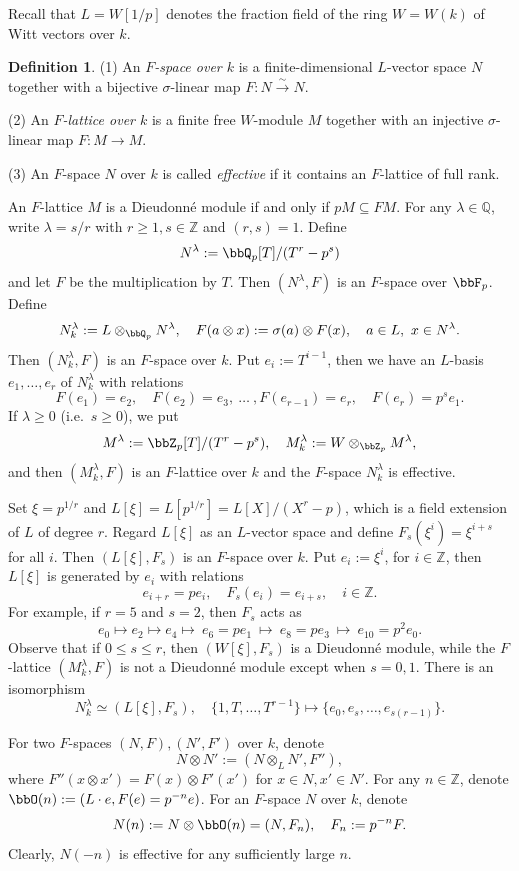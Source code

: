\documentclass[]{amsart}
\theoremstyle{plain}
\theoremstyle{definition}
\newtheorem{defn}[thm]{Definition}
\theoremstyle{remark}
\def\Fp{{\bbF}_p}
\def\Qp{{\bbQ}_p}
\def\Zp{{\bbZ}_p}
\newcommand{\Z}{\mathbb Z}
\newcommand{\Q}{\mathbb Q}
\newcommand{\npr}{\noindent }
\newcommand{\<}{\langle}   %
\renewcommand{\>}{\rangle} %
\newcommand{\isoto}{\stackrel{\sim}{\longrightarrow}}
\newcommand{\dieu}{Dieudonn\'{e} }
\begin{document}
Recall that $L=W[1/p]$ denotes the fraction field of the ring $W=W(k)$ of Witt vectors over $k$. 
\begin{defn}

    (1) An \emph{$F$-space over $k$} is a finite-dimensional $L$-vector space $N$ together with a bijective $\sigma$-linear map $F:N\isoto N$. 

    (2) An \emph{$F$-lattice over $k$} is a finite free $W$-module $M$ together with an injective $\sigma$-linear map $F:M\to M$. 

    (3) An $F$-space $N$ over $k$ is called \emph{effective} if it contains an $F$-lattice of full rank. 
\end{defn}
An $F$-lattice $M$ is a \dieu module if and only if $pM \subseteq FM$. 
For any $\lambda\in \Q$, write $\lambda=s/r$ with $r\ge 1,s\in \Z$ and $(r,s)=1$. Define
\[ N^\lambda:=\Qp[T]/(T^r-p^s)\]
and let $F$ be the multiplication by $T$. Then $(N^\lambda, F)$ is an $F$-space over $\Fp$. Define
\[ N^\lambda_k:=L\otimes_{\Qp} N^\lambda, \quad F(a\otimes x):=\sigma(a)\otimes F(x), \quad  a\in L,\ x\in N^\lambda.\]
Then $(N^\lambda_k,F)$ is an $F$-space over $k$. Put $e_i:=T^{i-1}$, then we have an $L$-basis $e_1,\dots, e_{r}$ of $N^\lambda_k$ with relations
\[ F(e_1)=e_2, \quad F(e_2)=e_3, \ \dots \  , F(e_{r-1})=e_r, \quad F(e_r)=p^s e_1. \]
If $\lambda\ge 0$ (i.e.~$s\ge 0$), we put
\[ M^\lambda:=\Zp[T]/(T^r-p^s), \quad M^\lambda_k:=W\otimes_{\Zp} M^\lambda,\]
and then $(M^\lambda_k, F)$ is an $F$-lattice over $k$ and the $F$-space $N^\lambda_k$ is effective.

Set $\xi=p^{1/r}$ and $L[\xi]=L[p^{1/r}]=L[X]/(X^r-p)$, which is a field extension of $L$ of degree $r$. Regard $L[\xi]$ as an $L$-vector space and define
$F_s(\xi^i)=\xi^{i+s}$ for all $i$.
Then $(L[\xi], F_s)$ is an $F$-space over $k$. Put $e_i:=\xi^i$, for $i\in \Z$, then $L[\xi]$ is generated by $e_i$ with relations
\[ e_{i+r}=pe_i, \quad F_s(e_i)=e_{i+s}, \quad  i\in\Z. \]
For example, if $r=5$ and $s=2$, then $F_s$ acts as
\[ e_0 \longmapsto e_2 \longmapsto  e_4 \longmapsto \  e_6=p e_1 \  \longmapsto  \ e_8=pe_3 \ \longmapsto  \ e_{10}=p^2 e_0.\]
Observe that if $0\le s\le r$, then $(W[\xi], F_s)$ is a \dieu module, while the $F$-lattice $(M^\lambda_k, F)$ is not a \dieu module except when $s=0,1$. There is an isomorphism 
\[ N_k^\lambda \simeq (L[\xi], F_s), \quad \{1,T,\dots, T^{r-1} \} \longmapsto \{e_0, e_s, \dots, e_{s(r-1)} \}. \]

\npr {\it Notation.} 
For two $F$-spaces $(N,F), (N',F')$ over $k$, denote \[ N\otimes N':=(N\otimes_{L} N', F''), \] 
where $F''(x\otimes x')=F(x)\otimes F'(x')$ for $x\in N, x'\in N'$. 
For any $n\in \Z$, denote $\bbO(n):=(L\cdot e, F(e)=p^{-n} e)$. 
For an $F$-space $N$ over $k$, denote \[ N(n):=N\otimes \bbO(n)=(N, F_n), \quad F_n:=p^{-n}F. \] 
Clearly, $N(-n)$ is effective for any sufficiently large $n$. 
\end{document}
